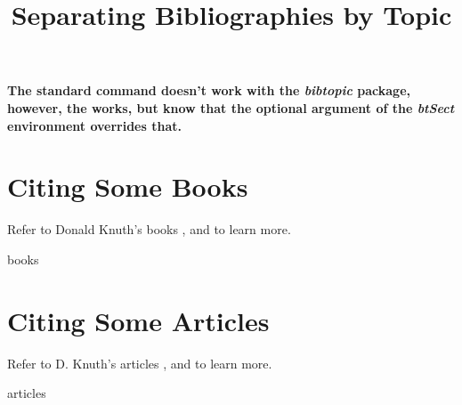 \documentclass{article}
\title{\bf Separating Bibliographies by Topic}
\date{}
\begin{document}
	\maketitle
	
	{\large\bf The standard \verb|| command doesn't work with the \textit{bibtopic} package, however, the \verb|| works, but know that the optional argument of the \textit{btSect} environment overrides that.}	
	
	\section{Citing Some Books}
	Refer to Donald Knuth's books \cite{Knuth-CT}, and
		\cite{Knuth-ACP} to learn more.
	\begin{btSect}[plain]{books}
		\btPrintCited
	\end{btSect}
	
	\section{Citing Some Articles}
	Refer to D. Knuth's articles \cite{Knuth-TB}, and
	\cite{Knuth-LP} to learn more.
	\begin{btSect}[alpha]{articles}
		\btPrintCited
	\end{btSect}
	
\end{document}
